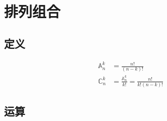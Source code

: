 \section{排列组合}
\subsection{定义}
\begin{align}
\mathbb{A}_n^k &= \frac{n!}{(n-k)!} \\
\mathbb{C}_n^k &= \frac{\mathbb{A}_n^k}{k!} = \frac{n!}{k!(n-k)!}
\end{align}
\subsection{运算}

